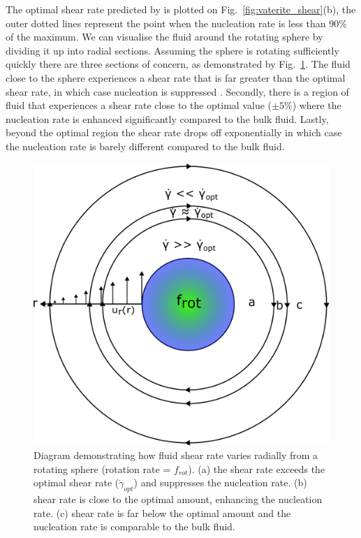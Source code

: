 The optimal shear rate predicted by \cite{Debuysschere2023} is 
plotted on Fig.~\ref{fig:vaterite_shear}(b), the outer dotted 
lines represent the point when the nucleation rate is less than 
90\% of the maximum. We can visualise the fluid around the 
rotating sphere by dividing it up into radial sections. Assuming 
the sphere is rotating sufficiently quickly there are three 
sections of concern, as demonstrated by Fig.~\ref{fig:shear_diagram}. 
The fluid close to the sphere experiences a shear rate that 
is far greater than the optimal shear rate, in which case 
nucleation is suppressed \cite{Mura2016}. Secondly, there is 
a region of fluid that experiences a shear rate close to the 
optimal value ($\pm 5\%$) where the nucleation rate is enhanced 
significantly compared to the bulk fluid. Lastly, beyond the 
optimal region the shear rate drops off exponentially in which 
case the nucleation rate is barely different compared to the 
bulk fluid.
\begin{figure}[h!]
	\centering
	\includegraphics[width=0.875\linewidth]{shear_rate_diagram.pdf}
	\caption{Diagram demonstrating how fluid shear rate varies 
	radially from a rotating sphere (rotation rate = $f_{rot}$). 
	(a) the shear rate exceeds the optimal shear rate 
	($\dot{\gamma}_{opt}$) and suppresses the nucleation rate. 
	(b) shear rate is close to the optimal amount, enhancing the 
	nucleation rate. (c) shear rate is far below the optimal 
	amount and the nucleation rate is comparable to the bulk fluid.}
	\label{fig:shear_diagram}
\end{figure}

